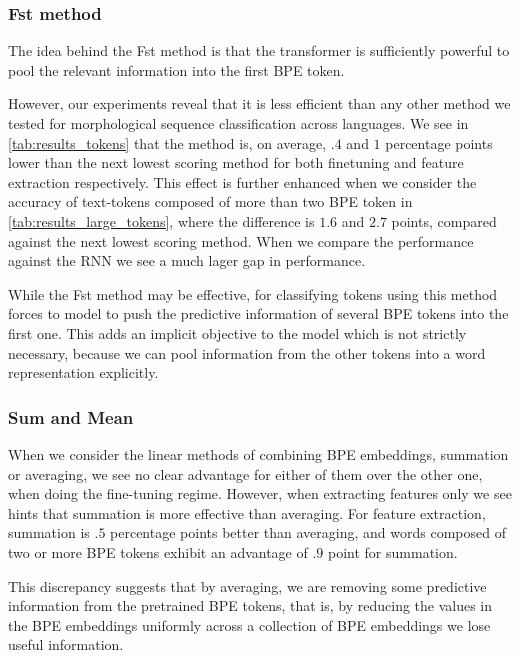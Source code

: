 \documentclass[11pt]{article}
\begin{document}
    \subsubsection{Fst method}

            The idea behind the Fst method is that the transformer is
     sufficiently powerful to pool the relevant information into the
     first BPE token.
    
                            However, our experiments reveal that it is
     less efficient than any other method we tested for morphological
     sequence classification across languages. We see in
     \cref{tab:results_tokens} that the method is, on average, $.4$
     and $1$ percentage points lower than the next lowest scoring
     method for both finetuning and feature extraction respectively.
     This effect is further enhanced when we consider the
     accuracy of text-tokens composed of more than two BPE token in
     \cref{tab:results_large_tokens}, where the difference is $1.6$
     and $2.7$ points, compared against the next lowest scoring
     method. When we compare the performance against the RNN we see a
     much lager gap in performance.

             While the Fst method may be effective, for classifying
     tokens using this method forces to model to push the predictive
     information of several BPE tokens into the first one. This adds
     an implicit objective to the model which is not strictly
     necessary, because we can pool information from the other tokens
     into a word representation explicitly.

    \subsubsection{Sum and Mean}
            When we consider the linear methods of combining BPE
     embeddings, summation or averaging, we see no clear advantage for
     either of them over the other one, when doing the fine-tuning regime. However, when
     extracting features only we see hints that summation is more
     effective than averaging. For feature extraction, summation is
     $.5$ percentage points better than averaging, and words composed of two or more BPE tokens exhibit an
     advantage of $.9$ point for summation.
    
                This discrepancy suggests that by averaging, we are
     removing some predictive information from the pretrained BPE
     tokens, that is, by reducing the values in the BPE embeddings
     uniformly across a collection of BPE embeddings we lose useful
     information.
    
\end{document}
